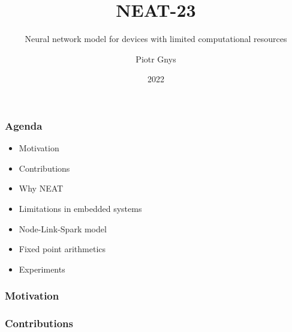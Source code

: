\documentclass{beamer}
\title{NEAT-23}
\subtitle{Neural network model for devices with limited computational resources}
\author{Piotr Gnys}
\institute{Polish Japanese Academy of Information Technology}
\date{2022}
\begin{document}
\frame{\titlepage}

\begin{frame}
\frametitle{Agenda}
	\begin{itemize}
		\item Motivation
		\item Contributions
		\item Why NEAT
		\item Limitations in embedded systems
		\item Node-Link-Spark model
		\item Fixed point arithmetics
		\item Experiments
	\end{itemize}
\end{frame}

\begin{frame}
\frametitle{Motivation}
\end{frame}

\begin{frame}
\frametitle{Contributions}
\end{frame}
\end{document}
